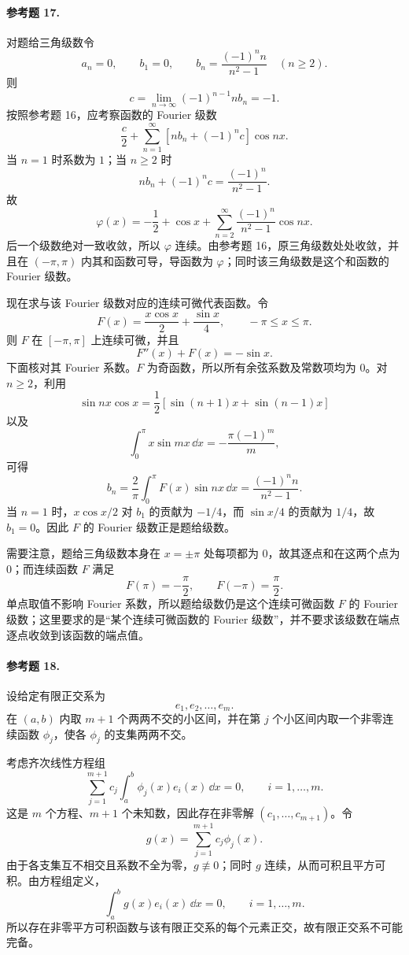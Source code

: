\paragraph{参考题 17.}
\begin{xsolution}
对题给三角级数令
\[
  a_n=0,
  \qquad b_1=0,
  \qquad b_n=\frac{(-1)^n n}{n^2-1}\quad(n\ge2).
\]
则
\[
  c=\lim_{n\to\infty}(-1)^{n-1}nb_n
  =-1.
\]
按照参考题 16，应考察函数的 Fourier 级数
\[
  \frac c2+
  \sum_{n=1}^{\infty}[nb_n+(-1)^nc]\cos nx.
\]
当 $n=1$ 时系数为 $1$；当 $n\ge2$ 时
\[
  nb_n+(-1)^nc
  =\frac{(-1)^n}{n^2-1}.
\]
故
\[
  \varphi(x)=-\frac12+\cos x+
  \sum_{n=2}^{\infty}\frac{(-1)^n}{n^2-1}\cos nx.
\]
后一个级数绝对一致收敛，所以 $\varphi$ 连续。由参考题 16，原三角级数处处收敛，并且在 $(-\pi,\pi)$ 内其和函数可导，导函数为 $\varphi$；同时该三角级数是这个和函数的 Fourier 级数。

现在求与该 Fourier 级数对应的连续可微代表函数。令
\[
  \boxed{\displaystyle
  F(x)=\frac{x\cos x}{2}+\frac{\sin x}{4},
  \qquad -\pi\le x\le\pi }.
\]
则 $F$ 在 $[-\pi,\pi]$ 上连续可微，并且
\[
  F''(x)+F(x)=-\sin x.
\]
下面核对其 Fourier 系数。$F$ 为奇函数，所以所有余弦系数及常数项均为 $0$。对 $n\ge2$，利用
\[
  \sin nx\cos x=\frac12[\sin(n+1)x+\sin(n-1)x]
\]
以及
\[
  \int_0^\pi x\sin mx\,\dd x=-\frac{\pi(-1)^m}{m},
\]
可得
\[
  b_n=\frac2\pi\int_0^\pi F(x)\sin nx\,\dd x
  =\frac{(-1)^n n}{n^2-1}.
\]
当 $n=1$ 时，$x\cos x/2$ 对 $b_1$ 的贡献为 $-1/4$，而 $\sin x/4$ 的贡献为 $1/4$，故 $b_1=0$。因此 $F$ 的 Fourier 级数正是题给级数。

需要注意，题给三角级数本身在 $x=\pm\pi$ 处每项都为 $0$，故其逐点和在这两个点为 $0$；而连续函数 $F$ 满足
\[
  F(\pi)=-\frac\pi2,\qquad F(-\pi)=\frac\pi2.
\]
单点取值不影响 Fourier 系数，所以题给级数仍是这个连续可微函数 $F$ 的 Fourier 级数；这里要求的是“某个连续可微函数的 Fourier 级数”，并不要求该级数在端点逐点收敛到该函数的端点值。
\end{xsolution}

\paragraph{参考题 18.}
\begin{xsolution}
设给定有限正交系为
\[
  e_1,e_2,\ldots,e_m.
\]
在 $(a,b)$ 内取 $m+1$ 个两两不交的小区间，并在第 $j$ 个小区间内取一个非零连续函数 $\phi_j$，使各 $\phi_j$ 的支集两两不交。

考虑齐次线性方程组
\[
  \sum_{j=1}^{m+1}c_j\int_a^b\phi_j(x)e_i(x)\,\dd x=0,
  \qquad i=1,\ldots,m.
\]
这是 $m$ 个方程、$m+1$ 个未知数，因此存在非零解
$(c_1,\ldots,c_{m+1})$。令
\[
  g(x)=\sum_{j=1}^{m+1}c_j\phi_j(x).
\]
由于各支集互不相交且系数不全为零，$g\not\equiv0$；同时 $g$ 连续，从而可积且平方可积。由方程组定义，
\[
  \int_a^bg(x)e_i(x)\,\dd x=0,
  \qquad i=1,\ldots,m.
\]
所以存在非零平方可积函数与该有限正交系的每个元素正交，故有限正交系不可能完备。
\end{xsolution}


